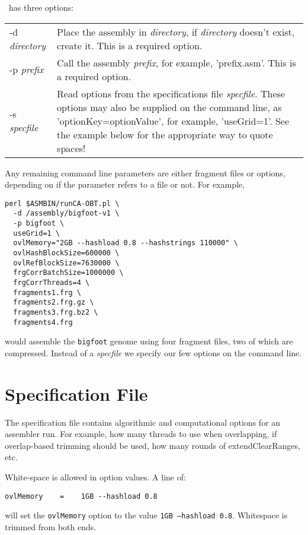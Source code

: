\documentclass[twoside,11pt]{article}
\begin{document}
\runCA\ has three options:

\begin{longtable}{lp{3.0in}}
-d {\it directory} &
Place the assembly in {\it directory}, if {\it directory} doesn't exist,
create it.  This is a required option.
\\
-p {\it prefix} &
Call the assembly {\it prefix}, for example, 'prefix.asm'. This is a required
option.
\\
-s {\it specfile} &
Read options from the specifications file {\it specfile}.  These
options may also be supplied on the command line, as
'optionKey=optionValue', for example, 'useGrid=1'.  See the example
below for the appropriate way to quote spaces!
\end{longtable}

Any remaining command line parameters are either fragment files or
options, depending on if the parameter refers to a file or not.  For
example,

\begin{verbatim}
perl $ASMBIN/runCA-OBT.pl \
  -d /assembly/bigfoot-v1 \
  -p bigfoot \
  useGrid=1 \
  ovlMemory="2GB --hashload 0.8 --hashstrings 110000" \
  ovlHashBlockSize=600000 \
  ovlRefBlockSize=7630000 \
  frgCorrBatchSize=1000000 \
  frgCorrThreads=4 \
  fragments1.frg \
  fragments2.frg.gz \
  fragments3.frg.bz2 \
  fragments4.frg
\end{verbatim}

would assemble the {\tt bigfoot} genome using four fragment files, two
of which are compressed.  Instead of a {\it specfile} we specify our
few options on the command line.

\section{Specification File}

The specification file contains algorithmic and computational options
for an assembler run.  For example, how many threads to use when
overlapping, if overlap-based trimming should be used, how many rounds
of extendClearRanges, etc.

White-space is allowed in option values.  A line of:
\begin{verbatim}
ovlMemory    =    1GB --hashload 0.8
\end{verbatim}
will set the {\tt ovlMemory} option to the value {\tt 1GB --hashload
0.8}.  Whitespace is trimmed from both ends.
\end{document}
